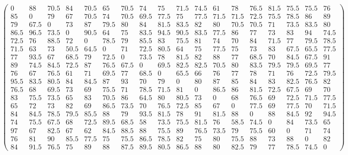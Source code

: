 {\tiny 	\[ %
	\left(\begin{array}{cccccccccccccccccc}
	0 & 88 & 70.5 & 84 & 70.5 & 65 & 70.5 & 74 & 75 & 71.5 & 74.5 & 61 & 78 & 76.5 & 81.5 & 75.5 & 75.5 & 76 \\
	85 & 0 & 79 & 67 & 70.5 & 74 & 70.5 & 69.5 & 77.5 & 75 & 77.5 & 71.5 & 71.5 & 72.5 & 75.5 & 78.5 & 86 & 89 \\
	79 & 67.5 & 0 & 73 & 87 & 79.5 & 80 & 84 & 81.5 & 83.5 & 82 & 80 & 70.5 & 70.5 & 71 & 73.5 & 83.5 & 80 \\
	86.5 & 96.5 & 73.5 & 0 & 90.5 & 64 & 75 & 83.5 & 94.5 & 90.5 & 83.5 & 77.5 & 86 & 77 & 73 & 83 & 94 & 74.5 \\
	72.5 & 76 & 88.5 & 72 & 0 & 78.5 & 79 & 85.5 & 83 & 75.5 & 81 & 74 & 70 & 84 & 71.5 & 77 & 79.5 & 78.5 \\
	71.5 & 63 & 73 & 50.5 & 64.5 & 0 & 71 & 72.5 & 80.5 & 64 & 75 & 77.5 & 75 & 73 & 83 & 67.5 & 65.5 & 77.5 \\
	77 & 93.5 & 67 & 68.5 & 79 & 72.5 & 0 & 73.5 & 78 & 81.5 & 82 & 88 & 77 & 68.5 & 70 & 84.5 & 67.5 & 91 \\
	89 & 74.5 & 84.5 & 72.5 & 87 & 76.5 & 67.5 & 0 & 69.5 & 82.5 & 82.5 & 70.5 & 80 & 83.5 & 79.5 & 79.5 & 69.5 & 77 \\
	76 & 67 & 76.5 & 61 & 71 & 69.5 & 77 & 68.5 & 0 & 65.5 & 66 & 76 & 77 & 78 & 71 & 76 & 72.5 & 79.5 \\
	95.5 & 83.5 & 80.5 & 84 & 84.5 & 87 & 93 & 70 & 79 & 0 & 80 & 87 & 85 & 84 & 83 & 82.5 & 76.5 & 82 \\
	76.5 & 68 & 69.5 & 73 & 69 & 75.5 & 71 & 78.5 & 71.5 & 81 & 0 & 86.5 & 86 & 81.5 & 72.5 & 67.5 & 69 & 70 \\
	83 & 75.5 & 73.5 & 65 & 83 & 70.5 & 86 & 64.5 & 80 & 80.5 & 73 & 0 & 68 & 76.5 & 69 & 72.5 & 71.5 & 77.5 \\
	65 & 72 & 73 & 82 & 69 & 86.5 & 73.5 & 70 & 76.5 & 72.5 & 85 & 67 & 0 & 77.5 & 69 & 77.5 & 70 & 71.5 \\
	84 & 84.5 & 78.5 & 79.5 & 85.5 & 88 & 79 & 93.5 & 81.5 & 78 & 91 & 81.5 & 88 & 0 & 88 & 84.5 & 92 & 94.5 \\
	74 & 75.5 & 67.5 & 68 & 72.5 & 89.5 & 68.5 & 58 & 73.5 & 75.5 & 81.5 & 76 & 58.5 & 74.5 & 0 & 84 & 73.5 & 65 \\
	97 & 67 & 82.5 & 67 & 62 & 84.5 & 88.5 & 88 & 75.5 & 89 & 76.5 & 73.5 & 79 & 75.5 & 60 & 0 & 71 & 74 \\
	76 & 81 & 90 & 85.5 & 77.5 & 75 & 75.5 & 86.5 & 78.5 & 82 & 75 & 80 & 75.5 & 88 & 73 & 88 & 0 & 82 \\
	84 & 91.5 & 76.5 & 75 & 89 & 88 & 87.5 & 89.5 & 80.5 & 86.5 & 88 & 80 & 82.5 & 79 & 77 & 78.5 & 74.5 & 0 	
	\end{array} \right) 
	\]}
	
